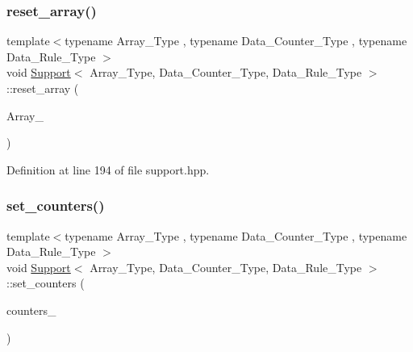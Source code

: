 \mbox{\label{class_support_a6e39b22dfd1e0a0ceebf596c974f5326}} 
\subsubsection{\texorpdfstring{reset\+\_\+array()}{reset\_array()}\hspace{0.1cm}{\footnotesize\ttfamily [2/2]}}
{\footnotesize\ttfamily template$<$typename Array\+\_\+\+Type , typename Data\+\_\+\+Counter\+\_\+\+Type , typename Data\+\_\+\+Rule\+\_\+\+Type $>$ \\
void \hyperlink{class_support}{Support}$<$ Array\+\_\+\+Type, Data\+\_\+\+Counter\+\_\+\+Type, Data\+\_\+\+Rule\+\_\+\+Type $>$\+::reset\+\_\+array (\begin{DoxyParamCaption}\item[{const Array\+\_\+\+Type $\ast$}]{Array\+\_\+ }\end{DoxyParamCaption})\hspace{0.3cm}{\ttfamily [inline]}}



Definition at line 194 of file support.\+hpp.

\mbox{\label{class_support_aa6070db8aa83e220b8c9a1d80dfb57c0}} 
\subsubsection{\texorpdfstring{set\+\_\+counters()}{set\_counters()}}
{\footnotesize\ttfamily template$<$typename Array\+\_\+\+Type , typename Data\+\_\+\+Counter\+\_\+\+Type , typename Data\+\_\+\+Rule\+\_\+\+Type $>$ \\
void \hyperlink{class_support}{Support}$<$ Array\+\_\+\+Type, Data\+\_\+\+Counter\+\_\+\+Type, Data\+\_\+\+Rule\+\_\+\+Type $>$\+::set\+\_\+counters (\begin{DoxyParamCaption}\item[{\hyperlink{class_counter_vector}{Counter\+Vector}$<$ Array\+\_\+\+Type, Data\+\_\+\+Counter\+\_\+\+Type $>$ $\ast$}]{counters\+\_\+ }\end{DoxyParamCaption})\hspace{0.3cm}{\ttfamily [inline]}}



